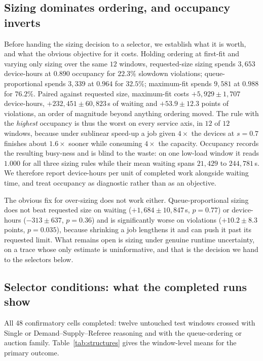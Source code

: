 \documentclass[conference]{IEEEtran}
\begin{document}
\subsection{Sizing dominates ordering, and occupancy inverts}
\label{sec:rigid}

Before handing the sizing decision to a selector, we establish what it is worth, and what the obvious
objective for it costs.  Holding ordering at first-fit and varying only
sizing over the same $12$ windows, requested-size sizing spends $3{,}653$ device-hours at $0.890$
occupancy for $22.3\%$ slowdown violations; queue-proportional spends $3{,}339$ at $0.964$ for
$32.5\%$; maximum-fit spends $9{,}581$ at $0.988$ for $76.2\%$.  Paired against requested size,
maximum-fit costs $+5{,}929 \pm 1{,}707$ device-hours, $+232{,}451 \pm 60{,}823$\,s of waiting and
$+53.9 \pm 12.3$ points of violations, an order of magnitude beyond anything ordering moved.  The rule
with the \emph{highest} occupancy is thus the worst on every service axis, in $12$ of $12$ windows,
because under sublinear speed-up a job given $4\times$ the devices at $s{=}0.7$ finishes about
$1.6\times$ sooner while consuming $4\times$ the capacity.  Occupancy records the resulting busy-ness
and is blind to the waste: on one low-load window it reads $1.000$ for all three sizing rules while
their mean waiting spans $21{,}429$ to $244{,}781$\,s.  We therefore report device-hours per unit of
completed work alongside waiting time, and treat occupancy as diagnostic rather than as an objective.

The obvious fix for over-sizing does not work either.  Queue-proportional sizing does not beat
requested size on waiting ($+1{,}684 \pm 10{,}847$\,s, $p{=}0.77$) or device-hours ($-313 \pm 637$,
$p{=}0.36$) and is significantly worse on violations ($+10.2 \pm 8.3$ points, $p{=}0.035$), because
shrinking a job lengthens it and can push it past its requested limit.  What remains open is sizing
under genuine runtime uncertainty, on a trace whose only estimate is uninformative, and that is the
decision we hand to the selectors below.
\subsection{Selector conditions: what the completed runs show}
\label{sec:factorial-results}

All 48 confirmatory cells completed: twelve untouched test windows crossed with Single or
Demand--Supply--Referee reasoning and with the queue-ordering or auction family.
Table~\ref{tab:structures} gives the window-level means for the primary outcome.
\end{document}
